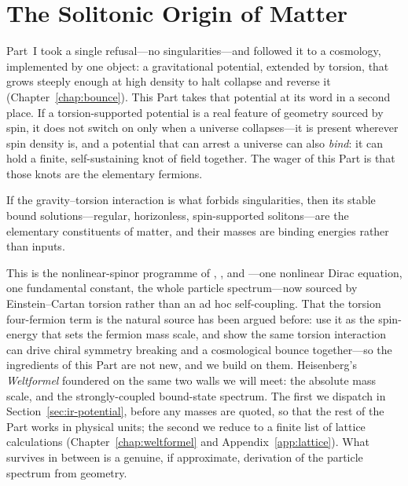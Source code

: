 \chapter{The Solitonic Origin of Matter}
\label{chap:solitons}

Part~I took a single refusal---no singularities---and followed it to a cosmology, implemented
by one object: a gravitational potential, extended by torsion, that grows steeply enough at
high density to halt collapse and reverse it (Chapter~\ref{chap:bounce}). This Part takes that
potential at its word in a second place. If a torsion-supported potential is a real feature of
geometry sourced by spin, it does not switch on only when a universe collapses---it is present
wherever spin density is, and a potential that can arrest a universe can also \emph{bind}: it
can hold a finite, self-sustaining knot of field together. The wager of this Part is that those
knots are the elementary fermions.

\begin{conjecture}
If the gravity--torsion interaction is what forbids singularities, then its stable bound
solutions---regular, horizonless, spin-supported solitons---are the elementary constituents of
matter, and their masses are binding energies rather than inputs.
\end{conjecture}

This is the nonlinear-spinor programme of \citet{finkelstein1951}, \citet{heisenberg1957},
and \citet{soler1970}---one nonlinear Dirac equation, one fundamental constant, the whole
particle spectrum---now sourced by Einstein--Cartan torsion rather than an ad hoc
self-coupling. That the torsion four-fermion term is the natural source has been argued before:
\citet{diether2020} use it as the spin-energy that sets the fermion mass scale, and
\citet{tukhashvili2024} show the same torsion interaction can drive chiral symmetry breaking and
a cosmological bounce together---so the ingredients of this Part are not new, and we build on
them. Heisenberg's \emph{Weltformel} foundered on the same two walls we will meet: the absolute
mass scale, and the strongly-coupled bound-state spectrum. The first we dispatch in
Section~\ref{sec:ir-potential}, before any masses are quoted, so that the rest of the Part
works in physical units; the second we reduce to a finite list of lattice calculations
(Chapter~\ref{chap:weltformel} and Appendix~\ref{app:lattice}). What survives in between is a
genuine, if approximate, derivation of the particle spectrum from geometry.

